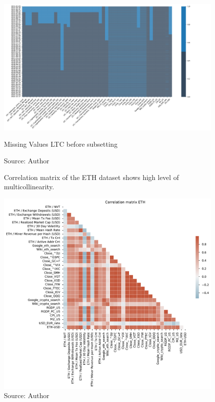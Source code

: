 \begin{figure}[!htbp]
    \centering
    \includegraphics[width=1.1\linewidth,height=0.9\textheight,keepaspectratio]{Figures/LTC_missing_1.pdf}
    \caption{Missing Values LTC before subsetting}
    \label{fig:ltc_missing_1}
    \caption*{Source: Author}
\end{figure}

\begin{figure}[!h]
    \centering
    \caption{Correlation matrix of the ETH dataset shows high level of 
    multicollinearity.}
    \includegraphics[width=1\textwidth]{Figures/Corr_eth.pdf}
    \caption*{Source: Author}
    \label{fig:Corr_eth}
\end{figure}

